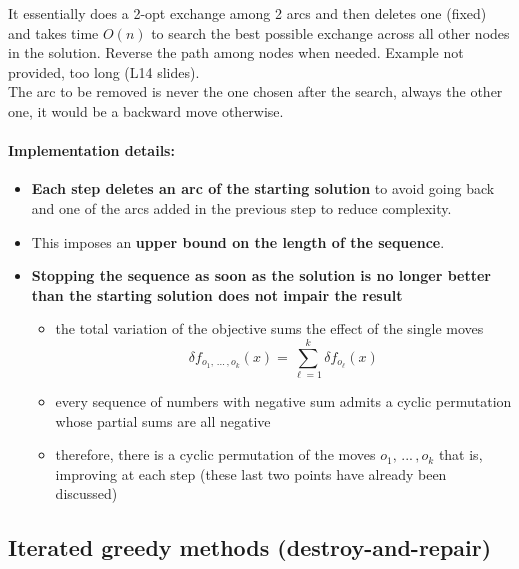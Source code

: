 \documentclass[11pt]{article}
\begin{document}
	It essentially does a 2-opt exchange among 2 arcs and then deletes one (fixed) and takes time $O(n)$ to search the best possible exchange across all other nodes in the solution. Reverse the path among nodes when needed. Example not provided, too long (L14 slides).\\
	
	The arc to be removed is never the one chosen after the search, always the other one, it would be a backward move otherwise.\\
	
	\newpage
	
	\paragraph{Implementation details:}
	\begin{itemize}
		\item \textbf{Each step deletes an arc of the starting solution} to avoid going back and one of the arcs added in the previous step to reduce complexity.\\
		
		\item This imposes an \textbf{upper bound on the length of the sequence}.\\
		
		\item \textbf{Stopping the sequence as soon as the solution is no longer better than the starting solution does not impair the result}
		\begin{itemize}
			\item the total variation of the objective sums the effect of the single moves
			$$ \delta f_{o_1, \, ... \, , o_k} (x) = \sum_{\ell = 1}^k \delta f_{o_{\ell}} (x) $$
			
			\item every sequence of numbers with negative sum admits a cyclic permutation whose partial sums are all negative
			
			\item therefore, there is a cyclic permutation of the moves $o_1, \, ... \, , o_k$ that is, improving at each step (these last two points have already been discussed)
		\end{itemize}
	\end{itemize}
	
	\newpage
	
	\subsection{Iterated greedy methods (destroy-and-repair)}
	
\end{document}

